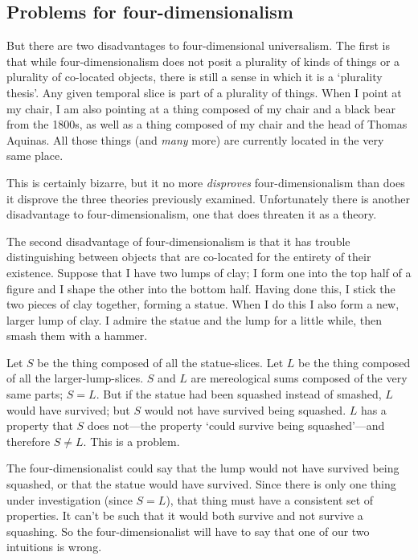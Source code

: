 \documentclass[11pt]{article}
\begin{document}
\begin{spacing}{1.5}
\subsection{Problems for four-dimensionalism}
\label{4dp}
But there are two disadvantages to four-dimensional universalism.  The
first is that while four-dimensionalism does not posit a plurality of
kinds of things or a plurality of co-located objects, there is still a
sense in which it is a `plurality thesis'.  Any given temporal slice
is part of a plurality of things.  When I point at my chair, I am also
pointing at a thing composed of my chair and a black bear from the
1800s, as well as a thing composed of my chair and the head of Thomas
Aquinas.  All those things (and {\em many} more) are currently located
in the very same place.

This is certainly bizarre, but it no more {\em disproves}
four-dimensionalism than does it disprove the three theories
previously examined.  Unfortunately there is another disadvantage to
four-dimensionalism, one that does threaten it as a theory.

The second disadvantage of four-dimensionalism is that it has trouble
distinguishing between objects that are co-located for the entirety of
their existence.  Suppose that I have two lumps of clay; I form one
into the top half of a figure and I shape the other into the bottom
half.  Having done this, I stick the two pieces of clay together,
forming a statue.  When I do this I also form a new, larger lump of
clay.  I admire the statue and the lump for a little while, then smash
them with a hammer.

Let $S$ be the thing composed of all the statue-slices.  Let $L$ be
the thing composed of all the larger-lump-slices.  $S$ and $L$ are
mereological sums composed of the very same parts; $S = L$.  But if
the statue had been squashed instead of smashed, $L$ would have
survived; but $S$ would not have survived being squashed.  $L$ has a
property that $S$ does not---the property `could survive being
squashed'---and therefore $S \neq L$.  This is a problem.

The four-dimensionalist could say that the lump would not have
survived being squashed, or that the statue would have survived.
Since there is only one thing under investigation (since $S = L$),
that thing must have a consistent set of properties.  It can't be such
that it would both survive and not survive a squashing.  So the
four-dimensionalist will have to say that one of our two intuitions is
wrong.


\end{spacing}
\end{document}
